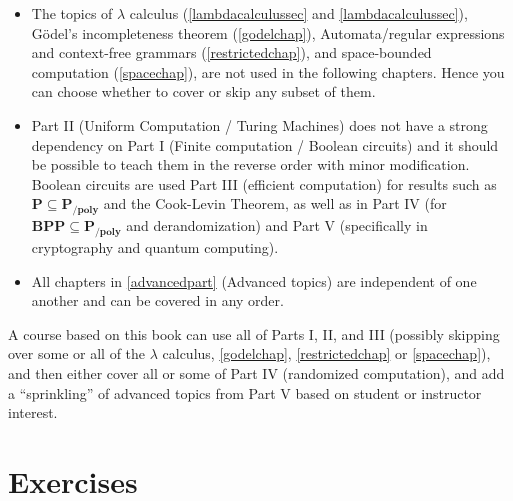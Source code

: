 \begin{itemize}
\item
  The topics of \(\lambda\) calculus (\cref{lambdacalculussec} and
  \cref{lambdacalculussec}), Gödel's incompleteness theorem
  (\cref{godelchap}), Automata/regular expressions and context-free
  grammars (\cref{restrictedchap}), and space-bounded computation
  (\cref{spacechap}), are not used in the following chapters. Hence you
  can choose whether to cover or skip any subset of them.
\item
  Part II (Uniform Computation / Turing Machines) does not have a strong
  dependency on Part I (Finite computation / Boolean circuits) and it
  should be possible to teach them in the reverse order with minor
  modification. Boolean circuits are used Part III (efficient
  computation) for results such as
  \(\mathbf{P} \subseteq \mathbf{P_{/poly}}\) and the Cook-Levin
  Theorem, as well as in Part IV (for
  \(\mathbf{BPP} \subseteq \mathbf{P_{/poly}}\) and derandomization) and
  Part V (specifically in cryptography and quantum computing).
\item
  All chapters in \cref{advancedpart} (Advanced topics) are independent
  of one another and can be covered in any order.
\end{itemize}

A course based on this book can use all of Parts I, II, and III
(possibly skipping over some or all of the \(\lambda\) calculus,
\cref{godelchap}, \cref{restrictedchap} or \cref{spacechap}), and then
either cover all or some of Part IV (randomized computation), and add a
``sprinkling'' of advanced topics from Part V based on student or
instructor interest.

\section{Exercises}\label{Exercises}


